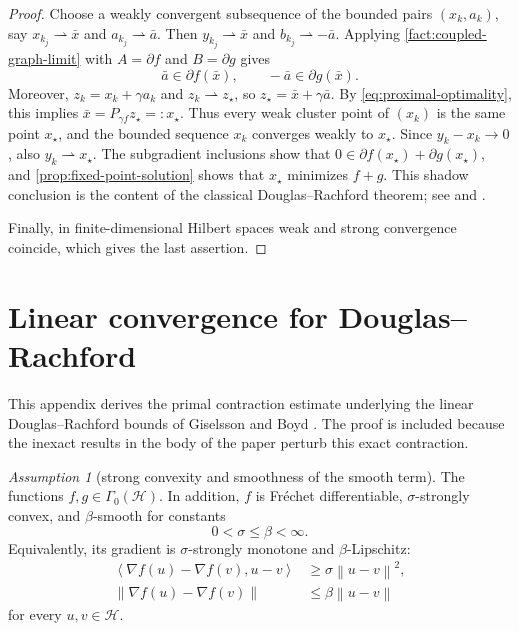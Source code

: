 \documentclass[10pt,leqno]{amsart}
\numberwithin{equation}{section}
\numberwithin{algorithm}{section}
\theoremstyle{remark}
\newtheorem{assumption}[theorem]{Assumption}
\newcommand{\Hcal}{\mathcal{H}}
\newcommand{\subd}{\partial}
\newcommand{\norm}[1]{\left\lVert #1 \right\rVert}
\newcommand{\ip}[2]{\left\langle #1,#2 \right\rangle}
\newcommand{\grad}{\nabla}
\begin{document}
\begin{proof}
Choose a weakly convergent subsequence of the bounded pairs $(x_k,a_k)$, say
$x_{k_j}\rightharpoonup\bar x$ and
$a_{k_j}\rightharpoonup\bar a$.  Then
$y_{k_j}\rightharpoonup\bar x$ and
$b_{k_j}\rightharpoonup-\bar a$.  Applying
\cref{fact:coupled-graph-limit} with
$A=\subd f$ and $B=\subd g$ gives
\[
  \bar a\in\subd f(\bar x),
  \qquad
  -\bar a\in\subd g(\bar x).
\]
Moreover, $z_k=x_k+\gamma a_k$ and $z_k\rightharpoonup z_\star$, so
$z_\star=\bar x+\gamma\bar a$.  By
\eqref{eq:proximal-optimality}, this implies
$\bar x=P_{\gamma f}z_\star=:x_\star$.
Thus every weak cluster point of $(x_k)$ is the same point $x_\star$, and the bounded sequence $x_k$ converges weakly to $x_\star$.  Since $y_k-x_k\to0$, also $y_k\rightharpoonup x_\star$.  The subgradient inclusions show that
$0\in\subd f(x_\star)+\subd g(x_\star)$, and
\cref{prop:fixed-point-solution} shows that $x_\star$ minimizes $f+g$.
This shadow conclusion is the content of the classical Douglas--Rachford theorem; see \cite[Thm.~26.11 and Cor.~28.3]{BauschkeCombettes2017} and \cite{EcksteinBertsekas1992}.

Finally, in finite-dimensional Hilbert spaces weak and strong convergence coincide, which gives the last assertion.
\end{proof}

\section{Linear convergence for Douglas--Rachford}
\label{app:linear-drs}

This appendix derives the primal contraction estimate underlying the linear Douglas--Rachford bounds of Giselsson and Boyd \cite{GiselssonBoyd2017}.  The proof is included because the inexact results in the body of the paper perturb this exact contraction.

\begin{assumption}[strong convexity and smoothness of the smooth term]
\label{ass:GB-primal}
The functions $f,g\in\Gamma_0(\Hcal)$.  In addition, $f$ is Fr\'echet differentiable, $\sigma$-strongly convex, and $\beta$-smooth for constants
\[
  0<\sigma\le\beta<\infty.
\]
Equivalently, its gradient is $\sigma$-strongly monotone and
$\beta$-Lipschitz:
\begin{align}
\label{eq:strong-gradient-monotonicity}
  \ip{\grad f(u)-\grad f(v)}{u-v}
  &\ge\sigma\norm{u-v}^2,\\
\label{eq:gradient-smoothness}
  \norm{\grad f(u)-\grad f(v)}
  &\le\beta\norm{u-v}
\end{align}
for every $u,v\in\Hcal$.
\end{assumption}
\end{document}
